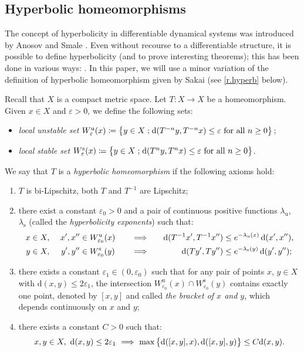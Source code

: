 \documentclass[JEP,XML,SOM,Unicode]{cedram}
\def\vcentcolon{\mathrel{\mathop\ordinarycolon}}
\providecommand\ordinarycolon{:}
\providecommand*\coloneqq{\vcentcolon\mathrel{\mkern-1.2mu}=}
\newcommand\implique{\mathchoice{\Longrightarrow}{\Rightarrow}{\Rightarrow}{\Rightarrow}}
\theoremstyle{plain}
\theoremstyle{definition}
\newcommand{\st}{\;\mathord{;}\;}
\newcommand{\dd}{\mathrm{d}}
\newcommand{\uu}{\mathrm{u}}
\renewcommand{\ss}{\mathrm{s}}
\let\epsilon\varepsilon
\begin{document}
\subsection{Hyperbolic homeomorphisms}\label{ss.hyp_homeo}

The concept of hyperbolicity in differentiable dynamical systems was introduced by Anosov \cite{Anosov} and Smale \cite{Smale}. Even without recourse to a differentiable structure, it is possible to define hyperbolicity (and to prove interesting theorems); this has been done in various ways: \cite{Bowen,Ruelle,AY,Akin,AH}. In this paper, we will use a minor variation of the definition of hyperbolic homeomorphism given by Sakai \cite{Sakai} (see \cref{r.hyperb} below).

Recall that $X$ is a compact metric space.
Let $T \colon X \to X$ be a homeomorphism.
Given $x \in X$ and $\epsilon>0$, we define the following sets:
\begin{itemize}
\item \emph{local unstable set} $W^\uu_\epsilon(x) \coloneqq \big\{ y \in X \st \dd(T^{-n} y, T^{-n} x) \le \epsilon \text{ for all } n\ge 0\big\}$;
\item \emph{local stable set} $W^\ss_\epsilon(x) \coloneqq \big\{ y \in X \st \dd(T^n y, T^n x) \le \epsilon \text{ for all } n\ge 0\big\}$.
\end{itemize}
We say that $T$ is a \emph{hyperbolic homeomorphism} if the following axioms hold:
\begin{enumerate}

\item\label{i.biLip}
$T$ is bi-Lipschitz, \ie both $T$ and $T^{-1}$ are Lipschitz;

\item\label{i.lambdas}
there exist a constant $\epsilon_0 > 0$ and a pair of continuous positive functions $\lambda_\uu$, $\lambda_\ss$ (called the \emph{hyperbolicity exponents}) such that:
\begin{alignat}{4}
\label{e.lambda_u}
x &\in X, &\ x', x'' &\in W^\uu_{\epsilon_0}(x) &\quad &\implique &\quad
\dd(T^{-1} x', T^{-1} x'') &\le e^{-\lambda_\uu(x)} \, \dd(x',x''), \\
\label{e.lambda_s}
y &\in X, &\ y', y'' &\in W^\ss_{\epsilon_0}(y) &\quad &\implique &\quad
\dd(T y', T y'') &\le e^{-\lambda_\ss(y)} \, \dd(y', y'') ;
\end{alignat}

\item\label{i.bracket}
there exists a constant $\epsilon_1 \in (0,\epsilon_0)$ such that for any pair of points $x$, $y \in X$ with $\dd(x,y) \le 2\epsilon_1$, the intersection $W^\uu_{\epsilon_0}(x) \cap W^\ss_{\epsilon_0}(y)$ contains exactly one point, denoted by $[x,y]$ and called \emph{the bracket of $x$ and $y$}, which depends continuously on $x$ and $y$;

\item\label{i.bounded_angles}
there exists a constant $C>0$ such that:
\begin{equation}\label{e.bounded_angles}
x, y \in X, \ \dd(x,y) \le 2\epsilon_1 \ \implique \
\max \big\{ \dd([x,y],x), \dd([x,y],y) \big\} \le C \dd(x,y).
\end{equation}
\end{enumerate}
\end{document}
